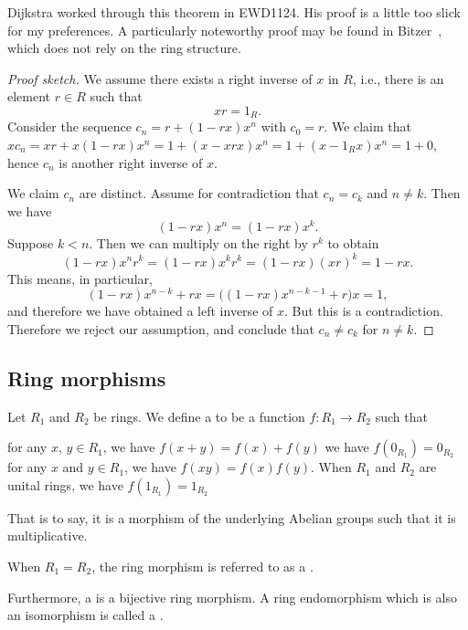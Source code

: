 Dijkstra worked through this theorem in EWD1124. His proof is a little
too slick for my preferences. A particularly noteworthy proof may be
found in Bitzer~\cite{bitzer1963inverses}, which does not rely on the
ring structure.

\begin{proof}[Proof sketch]
We assume there exists a right inverse of $x$ in $R$, i.e., there is
an element $r\in R$ such that
\begin{equation}
xr = 1_{R}.
\end{equation}
Consider the sequence $c_{n}=r+(1-rx)x^{n}$ with $c_{0}=r$. We claim
that $xc_{n}=xr+x(1-rx)x^{n}=1+(x-xrx)x^{n}=1+(x-1_{R}x)x^{n}=1+0$,
hence $c_{n}$ is another right inverse of $x$.

We claim $c_{n}$ are distinct. Assume for contradiction that
$c_{n}=c_{k}$ and $n\neq k$. Then we have
\begin{equation}
(1-rx)x^{n}=(1-rx)x^{k}.
\end{equation}
Suppose $k<n$. Then we can multiply on the right by $r^{k}$ to obtain
\begin{equation}
(1-rx)x^{n}r^{k}=(1-rx)x^{k}r^{k}=(1-rx)(xr)^{k}=1-rx.
\end{equation}
This means, in particular,
\begin{equation}
(1-rx)x^{n-k}+rx = \bigl((1-rx)x^{n-k-1}+r\bigr)x=1,
\end{equation}
and therefore we have obtained a left inverse of $x$. But this is a
contradiction. Therefore we reject our assumption, and conclude that
$c_{n}\neq c_{k}$ for $n\neq k$.
\end{proof}

\subsection{Ring morphisms}

\begin{definition}
Let $R_{1}$ and $R_{2}$ be rings. We define a 
to be a function $f\colon R_{1}\to R_{2}$ such that
\begin{itemize}
 for any $x$, $y\in R_{1}$, we have $f(x+y)=f(x)+f(y)$
 we have $f(0_{R_{1}})=0_{R_{2}}$
 for any $x$ and $y\in R_{1}$, we have $f(xy)=f(x)f(y)$.
 When $R_{1}$ and $R_{2}$ are unital rings,
  we have $f(1_{R_{1}})=1_{R_{2}}$
\end{itemize}%
That is to say, it is a morphism of the underlying Abelian groups such
that it is multiplicative.

When $R_{1} = R_{2}$, the ring morphism is referred to as a
.

Furthermore, a  is a bijective ring morphism.
A ring endomorphism which is also an isomorphism is called a
.
\end{definition}


